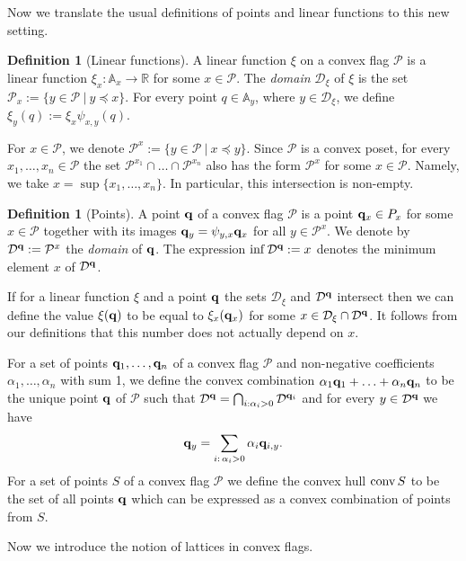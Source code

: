 \documentclass{daj}
\newcommand{\R}{\mathbb R}
\newcommand{\A}{\mathbb A}
\newcommand{\conv}{{\rm conv}\,}
\newcommand{\D}{\mathcal D}
\renewcommand{\P}{\mathcal P}
\theoremstyle{definition}
\newtheorem{defi}[theorem]{Definition}
\theoremstyle{remark}
\theoremstyle{definition}
\theoremstyle{definition}
\begin{document}
Now we translate the usual definitions of points and linear functions to this new setting. 

\begin{defi}[Linear functions]
A linear function $\xi$ on a convex flag $\P$ is a linear function $\xi_x: \A_x \rightarrow \R$ for some $x \in \P$. The {\em domain} $\D_\xi$ of $\xi$ is the set $\P_x := \{ y \in \P~|~y \preceq x\}$. For every point $q \in \A_y$, where $y \in \D_\xi$, we define $\xi_y(q) := \xi_x \psi_{x, y}(q)$.
\end{defi}

For $x \in \P$, we denote $\P^x :=\{ y \in \P~|~ x \preceq y\}$. Since $\P$ is a convex poset, for every $x_1, \ldots, x_n \in \P$ the set $\P^{x_1} \cap \ldots \cap \P^{x_n}$ also has the form $\P^x$ for some $x \in \P$. Namely, we take $x = \sup\{x_1, \ldots, x_n\}$. In particular, this intersection is non-empty.

\begin{defi}[Points]\label{pts}
A point $\bf q$ of a convex flag $\P$ is a point ${\bf q}_x \in P_x$ for some $x \in \P$ together with its images ${\bf q}_y = \psi_{y, x}{\bf q}_x$ for all $y \in \P^x$. We denote by $\D^{\bf q} := \P^x$ the {\em domain} of ${\bf q}$. The expression $\inf \D^{\bf q} := x$ denotes the minimum element $x$ of $\D^{\bf q}$.
\end{defi}

If for a linear function $\xi$ and a point $\bf q$ the sets $\D_\xi$ and $\D^{\bf q}$ intersect then we can define the value $\xi({\bf q})$ to be equal to $\xi_x({\bf q}_x)$ for some $x \in \D_\xi \cap \D^{\bf q}$. It follows from our definitions that this number does not actually depend on $x$.

For a set of points ${\bf q}_1, \ldots, {\bf q}_n$ of a convex flag $\P$ and non-negative coefficients $\alpha_1, \ldots, \alpha_n$ with sum 1, we define the convex combination $\alpha_1 {\bf q}_1 + \ldots + \alpha_n {\bf q}_n$ to be the unique point ${\bf q}$ of $\P$ such that $\D^{\bf q} = \bigcap_{i: \alpha_i > 0} \D^{{\bf q}_i}$ and for every $y \in \D^{\bf q}$ we have 
\begin{equation}\label{convc}
{\bf q}_y = \sum_{i:\, \alpha_i > 0} \alpha_i {\bf q}_{i, y}.
\end{equation}
For a set of points $S$ of a convex flag $\P$ we define the convex hull $\conv S$ to be the set of all points $\bf q$ which can be expressed as a convex combination of points from $S$.

Now we introduce the notion of lattices in convex flags.
\end{document}
